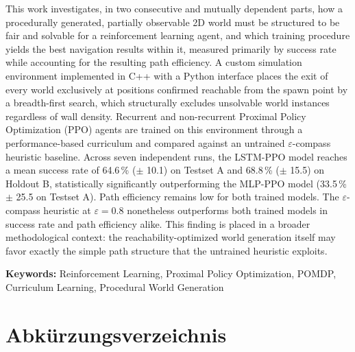 \documentclass[
  a4paper,
  11pt,
  twoside,
  BCOR=8mm,           %
  headings=big,
  numbers=noenddot,
  listof=totoc,       %
  captions=tableheading,
]{scrreprt}
\begin{document}
This work investigates, in two consecutive and mutually dependent parts, how a
procedurally generated, partially observable 2D world must be structured to
be fair and solvable for a reinforcement learning agent, and which training
procedure yields the best navigation results within it, measured primarily by
success rate while accounting for the resulting path efficiency. A custom
simulation environment implemented in C++ with a Python interface places the
exit of every world exclusively at positions confirmed reachable from the
spawn point by a breadth-first search, which structurally excludes unsolvable
world instances regardless of wall density. Recurrent and non-recurrent
Proximal Policy Optimization (PPO) agents are trained on this environment
through a performance-based curriculum and compared against an untrained
$\varepsilon$-compass heuristic baseline. Across seven independent runs, the
LSTM-PPO model reaches a mean success rate of 64.6\,\% ($\pm$ 10.1) on
Testset A and 68.8\,\% ($\pm$ 15.5) on Holdout B, statistically
significantly outperforming the MLP-PPO model (33.5\,\% $\pm$ 25.5 on
Testset A). Path efficiency remains low for both trained models. The
$\varepsilon$-compass heuristic at $\varepsilon = 0.8$ nonetheless
outperforms both trained models in success rate and path efficiency alike.
This finding is placed in a broader methodological context: the
reachability-optimized world generation itself may favor exactly the simple
path structure that the untrained heuristic exploits.

\bigskip
\noindent\textbf{Keywords:} Reinforcement Learning, Proximal Policy
Optimization, POMDP, Curriculum Learning, Procedural World Generation

\clearpage


\tableofcontents
\listoffigures
\listoftables
\lstlistoflistings

\chapter*{Abkürzungsverzeichnis}
\thispagestyle{empty}
\end{document}
